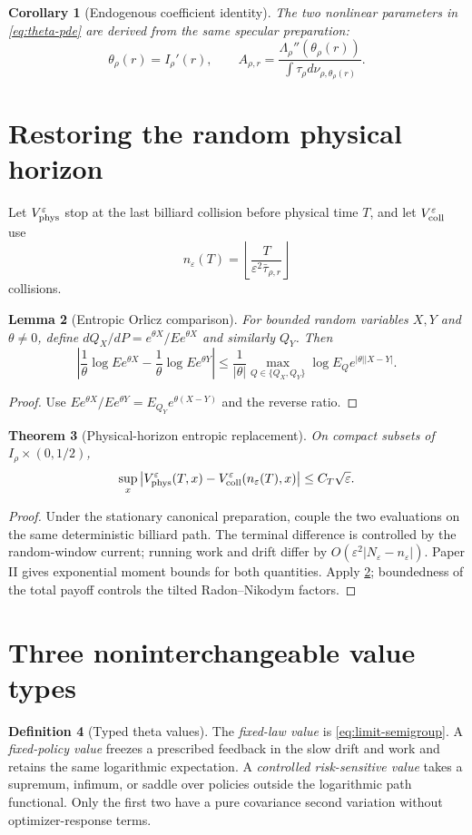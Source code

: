 \documentclass[11pt,reqno]{amsart}
\newtheorem{theorem}{Theorem}[section]
\newtheorem{lemma}[theorem]{Lemma}
\newtheorem{corollary}[theorem]{Corollary}
\theoremstyle{definition}
\newtheorem{definition}[theorem]{Definition}
\theoremstyle{remark}
\newcommand{\abs}[1]{\left\lvert #1\right\rvert}
\begin{document}
\begin{corollary}[Endogenous coefficient identity]\label{cor:endogenous}
The two nonlinear parameters in \eqref{eq:theta-pde} are derived from the same
specular preparation:
\[
 \theta_\rho(r)=I_\rho'(r),
 \qquad
 A_{\rho,r}
 =\frac{\Lambda_\rho''(\theta_\rho(r))}
 {\int\tau_\rho d\nu_{\rho,\theta_\rho(r)}}.
\]
\end{corollary}

\section{Restoring the random physical horizon}\label{sec:clock}
Let $V_{\rm phys}^{\varepsilon}$ stop at the last billiard collision before
physical time $T$, and let $V_{\rm coll}^{\varepsilon}$ use
\[
 n_\varepsilon(T)=\left\lfloor
 \frac{T}{\varepsilon^2\bar\tau_{\rho,r}}\right\rfloor
\]
collisions.

\begin{lemma}[Entropic Orlicz comparison]\label{lem:orlicz}
For bounded random variables $X,Y$ and $\theta\ne0$, define
$dQ_X/dP=e^{\theta X}/Ee^{\theta X}$ and similarly $Q_Y$.  Then
\[
 \abs{\frac1\theta\log Ee^{\theta X}
 -\frac1\theta\log Ee^{\theta Y}}
 \le\frac1{\abs\theta}
 \max_{Q\in\{Q_X,Q_Y\}}
 \log E_Qe^{\abs\theta\abs{X-Y}}.
\]
\end{lemma}
\begin{proof}
Use
$Ee^{\theta X}/Ee^{\theta Y}=E_{Q_Y}e^{\theta(X-Y)}$ and the reverse ratio.
\end{proof}

\begin{theorem}[Physical-horizon entropic replacement]\label{thm:replacement}
On compact subsets of $I_\rho\times(0,1/2)$,
\[
 \sup_x\abs{
 V_{\rm phys}^{\varepsilon}(T,x)
 -V_{\rm coll}^{\varepsilon}(n_\varepsilon(T),x)}
 \le C_T\sqrt\varepsilon.
\]
\end{theorem}
\begin{proof}
Under the stationary canonical preparation, couple the two evaluations on the
same deterministic billiard path.  The
terminal difference is controlled by the random-window current; running work
and drift differ by $O(\varepsilon^2|N_\varepsilon-n_\varepsilon|)$.
Paper II gives exponential moment bounds for both quantities.  Apply
\cref{lem:orlicz}; boundedness of the total payoff controls the tilted
Radon--Nikodym factors.
\end{proof}

\section{Three noninterchangeable value types}\label{sec:types}
\begin{definition}[Typed theta values]
The \emph{fixed-law value} is \eqref{eq:limit-semigroup}.  A
\emph{fixed-policy value} freezes a prescribed feedback in the slow drift and
work and retains the same logarithmic expectation.  A
\emph{controlled risk-sensitive value} takes a supremum, infimum, or saddle
over policies outside the logarithmic path functional.  Only the first two
have a pure covariance second variation without optimizer-response terms.
\end{definition}
\end{document}
